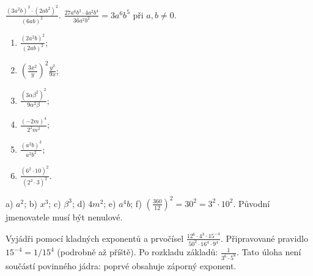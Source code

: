 \documentclass[11pt,a4paper]{article}
\begin{document}
\begin{prikladReseniBox}[title={Příklad 6},breakable=false]
$\displaystyle\frac{(3a^2b)^3\cdot(2ab^2)^2}{(6ab)^2}$.
\tcblower
$\displaystyle\frac{27a^6b^3\cdot4a^2b^4}{36a^2b^2}
=\boxed{3a^6b^5}$ při $a,b\ne0$.
\end{prikladReseniBox}
\begin{zadaniReseniBox}[title={Samostatná práce 6}]
\begin{enumerate}[label=\alph*)]
\item $\frac{(2a^2b)^2}{(2ab)^2}$;
\item $\left(\frac{3x^2}{y}\right)^2\frac{y^2}{9x}$;
\item $\frac{(3\alpha\beta^2)^2}{9\alpha^2\beta}$;
\item $\frac{(-2m)^4}{2^2m^2}$;
\item $\frac{(a^2b)^3}{a^2b^2}$;
\item $\frac{(6^2\cdot10)^2}{(2^2\cdot3)^2}$.
\end{enumerate}
\tcblower
 a) $a^2$; b) $x^3$; c) $\beta^3$;
 d) $4m^2$; e) $a^4b$;
 f) $\left(\frac{360}{12}\right)^2=30^2=3^2\cdot10^2$.
Původní jmenovatele musí být nenulové.
\end{zadaniReseniBox}
\begin{zadaniReseniBox}[title={Rozšíření 6},breakable=false]
Vyjádři pomocí kladných exponentů a prvočísel
$\displaystyle\frac{12^6\cdot4^3\cdot15^{-4}}{50^2\cdot16^4\cdot9^4}$.
\tcblower
Připravované pravidlo $15^{-4}=1/15^4$ (podrobně až příště).
Po rozkladu základů: $\boxed{\frac{1}{3^6\cdot5^8}}$.
Tato úloha není součástí povinného jádra: poprvé obsahuje záporný exponent.
\end{zadaniReseniBox}
\end{document}
